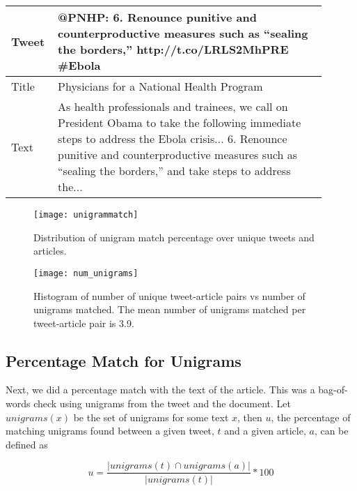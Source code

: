 \begin{table}[htbp]
\centering
\begin{tabular}{|p{0.1\linewidth}|p{0.8\linewidth}|}
\hline
Tweet &  @PNHP: 6. Renounce punitive and counterproductive measures such as “sealing the borders,” http://t.co/LRLS2MhPRE \#Ebola \\ \hline
Title & Physicians for a National Health Program \\  \hline
Text  & As health professionals and trainees, we call on President Obama to take the following immediate steps to address the Ebola crisis... 6. Renounce punitive and counterproductive measures such as “sealing the borders,” and take steps to address the... \\ \hline
\end{tabular}
\label{tab:fullextract}
\end{table}


\begin{figure}[tbp]
\centering
\texttt{[image: unigrammatch]}
\caption{Distribution of unigram match percentage over unique tweets and articles.}
\label{fig:unigrammatch}
\end{figure}


\begin{figure}[tbp]
\centering
\texttt{[image: num\_unigrams]}
\caption{Histogram of number of unique tweet-article pairs vs number of unigrams matched. The mean number of unigrams matched per tweet-article pair is 3.9.}
\label{fig:num_unigrams}
\end{figure}


\subsection{Percentage Match for Unigrams}
\label{sec:unigrams}

Next, we did a percentage match with the text of the article. This was a bag-of-words check using unigrams from the tweet and the document. Let $\textit{unigrams}(x)$ be the set of unigrams for some text $x$, then $u$, the percentage of matching unigrams found between a given tweet, $t$ and a given article, $a$, can be defined as  

\begin{equation}
u = \frac{| unigrams(t) \cap unigrams(a) |}{| unigrams(t) |} * 100
\end{equation}

